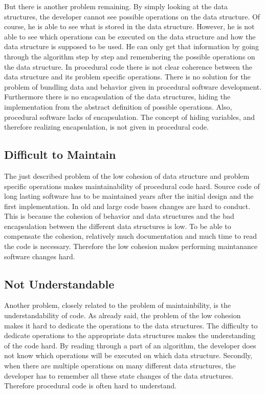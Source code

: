 But there is another problem remaining. By simply looking at the data structures, the developer cannot see possible operations on the data structure. Of course, he is able to see what is stored in the data structure. However, he is not able to see which operations can be executed on the data structure and how the data structure is supposed to be used. He can only get that information by going through the algorithm step by step and remembering the possible operations on the data structure. In procedural code there is not clear coherence between the data structure and its problem specific operations. There is no solution for the problem of bundling data and behavior given in procedural software development. \\

Furthermore there is no encapsulation of the data structures, hiding the implementation from the abstract definition of possible operations. Also, procedural software lacks of encapsulation. The concept of hiding variables, and therefore realizing encapsulation, is not given in procedural code. 

\subsection*{Difficult to Maintain}
\label{problem:maintainability}
The just described problem of the low cohesion of data structure and problem specific operations makes maintainability of procedural code hard. Source code of long lasting software has to be maintained years after the initial design and the first implementation. In old and large code bases changes are hard to conduct. This is because the cohesion of behavior and data structures and the bad encapsulation between the different data structures is low. To be able to compensate the cohesion, relatively much documentation and much time to read the code is necessary. Therefore the low cohesion makes performing maintanance software changes hard. 

\subsection*{Not Understandable}
Another problem, closely related to the problem of maintainbility, is the understandability of code. As already said, the problem of the low cohesion makes it hard to dedicate the operations to the data structures. The difficulty to dedicate operations to the appropriate data structures makes the understanding of the code hard. By  reading through a part of an algorithm, the developer does not know which operations will be executed on which data structure. Secondly, when there are multiple operations on many different data structures, the developer has to remember all these state changes of the data structures. Therefore procedural code is often hard to understand. 

